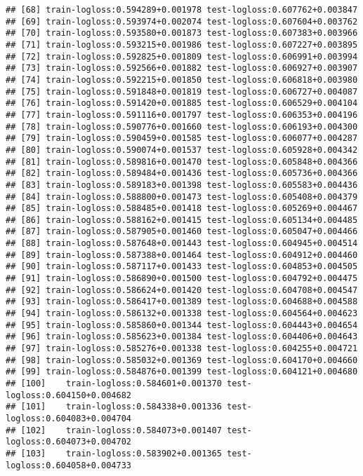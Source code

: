 \documentclass[
]{article}
\begin{document}
\begin{verbatim}
## [68] train-logloss:0.594289+0.001978 test-logloss:0.607762+0.003847 
## [69] train-logloss:0.593974+0.002074 test-logloss:0.607604+0.003762 
## [70] train-logloss:0.593580+0.001873 test-logloss:0.607383+0.003966 
## [71] train-logloss:0.593215+0.001986 test-logloss:0.607227+0.003895 
## [72] train-logloss:0.592825+0.001809 test-logloss:0.606991+0.003994 
## [73] train-logloss:0.592566+0.001882 test-logloss:0.606927+0.003907 
## [74] train-logloss:0.592215+0.001850 test-logloss:0.606818+0.003980 
## [75] train-logloss:0.591848+0.001819 test-logloss:0.606727+0.004087 
## [76] train-logloss:0.591420+0.001885 test-logloss:0.606529+0.004104 
## [77] train-logloss:0.591116+0.001797 test-logloss:0.606353+0.004196 
## [78] train-logloss:0.590776+0.001660 test-logloss:0.606193+0.004300 
## [79] train-logloss:0.590459+0.001585 test-logloss:0.606077+0.004287 
## [80] train-logloss:0.590074+0.001537 test-logloss:0.605928+0.004342 
## [81] train-logloss:0.589816+0.001470 test-logloss:0.605848+0.004366 
## [82] train-logloss:0.589484+0.001436 test-logloss:0.605736+0.004366 
## [83] train-logloss:0.589183+0.001398 test-logloss:0.605583+0.004436 
## [84] train-logloss:0.588800+0.001473 test-logloss:0.605408+0.004379 
## [85] train-logloss:0.588485+0.001418 test-logloss:0.605269+0.004467 
## [86] train-logloss:0.588162+0.001415 test-logloss:0.605134+0.004485 
## [87] train-logloss:0.587905+0.001460 test-logloss:0.605047+0.004466 
## [88] train-logloss:0.587648+0.001443 test-logloss:0.604945+0.004514 
## [89] train-logloss:0.587388+0.001464 test-logloss:0.604912+0.004460 
## [90] train-logloss:0.587117+0.001433 test-logloss:0.604853+0.004505 
## [91] train-logloss:0.586890+0.001500 test-logloss:0.604792+0.004475 
## [92] train-logloss:0.586624+0.001420 test-logloss:0.604708+0.004547 
## [93] train-logloss:0.586417+0.001389 test-logloss:0.604688+0.004588 
## [94] train-logloss:0.586132+0.001338 test-logloss:0.604564+0.004623 
## [95] train-logloss:0.585860+0.001344 test-logloss:0.604443+0.004654 
## [96] train-logloss:0.585623+0.001384 test-logloss:0.604406+0.004643 
## [97] train-logloss:0.585276+0.001338 test-logloss:0.604255+0.004721 
## [98] train-logloss:0.585032+0.001369 test-logloss:0.604170+0.004660 
## [99] train-logloss:0.584876+0.001399 test-logloss:0.604121+0.004680 
## [100]    train-logloss:0.584601+0.001370 test-logloss:0.604150+0.004682 
## [101]    train-logloss:0.584338+0.001336 test-logloss:0.604083+0.004704 
## [102]    train-logloss:0.584073+0.001407 test-logloss:0.604073+0.004702 
## [103]    train-logloss:0.583902+0.001365 test-logloss:0.604058+0.004733 

\end{verbatim}
\end{document}
